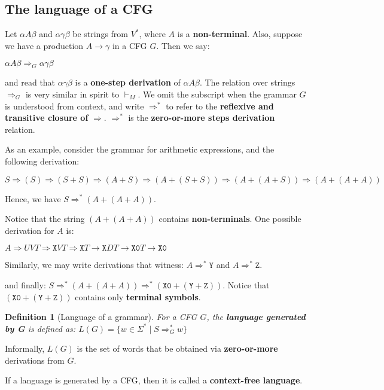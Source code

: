 \documentclass[a4paper, 12pt]{article}
\newtheorem*{theorem}{Definition}
\begin{document}
\subsection{ The language of a CFG }

Let $\alpha A\beta$ and $\alpha\gamma\beta$ be strings from $V^*$, where $A$ is a \textbf{non-terminal}. Also, suppose we have a production $A\rightarrow\gamma$ in a CFG $G$. Then we say:

$\alpha A\beta \Rightarrow_G \alpha\gamma\beta$

and read that $\alpha\gamma\beta$ is a \textbf{one-step derivation} of $\alpha A\beta$. The relation over strings $\Rightarrow_G$ is very similar in spirit to $\vdash_M$. We omit the subscript when the grammar $G$ is understood from context, and write $\Rightarrow^*$ to refer to the \textbf{reflexive and transitive closure of }$\Rightarrow$. $\Rightarrow^*$ is the \textbf{zero-or-more steps derivation} relation.

As an example, consider the grammar for arithmetic expressions, and the following derivation:

$S\Rightarrow (S)\Rightarrow(S+S)\Rightarrow(A+S)\Rightarrow(A+(S+S))\Rightarrow(A+(A+S))\Rightarrow(A+(A+A))$

Hence, we have $S\Rightarrow^*(A+(A+A))$.

Notice that the string $(A+(A+A))$ contains \textbf{non-terminals}.
One possible derivation for $A$ is:

$A\Rightarrow UVT\Rightarrow \texttt{X}VT\Rightarrow\texttt{X}T\rightarrow\texttt{X}DT\rightarrow\texttt{X0}T\rightarrow\texttt{X0}$

Similarly, we may write derivations that witness:
$A\Rightarrow^*\texttt{Y}$ and $A\Rightarrow^*\texttt{Z}$.

and finally: $S\Rightarrow^*(A+(A+A))\Rightarrow^*(\texttt{X0}+(\texttt{Y}+\texttt{Z}))$. Notice that $(\texttt{X0}+(\texttt{Y}+\texttt{Z}))$ contains only \textbf{terminal symbols}.

\begin{theorem}[Language of a grammar]

For a CFG $G$, the \textbf{language generated by G} is defined as: $L(G)=\{w\in\Sigma^*\mid S\Rightarrow^*_G w\}$

\end{theorem}

Informally, $L(G)$ is the set of words that be obtained via \textbf{zero-or-more} derivations from $G$.

If a language is generated by a CFG, then it is called a \textbf{context-free language}.
\end{document}
